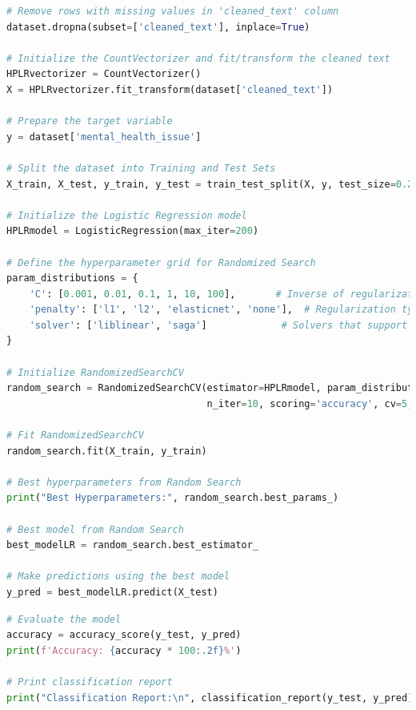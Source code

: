 \begin{tcolorbox}[colback=gray!5!white, colframe=gray!80!black, boxrule=0.5pt, title=Logistic Regression]
    \begin{lstlisting}[language=Python]
# Remove rows with missing values in 'cleaned_text' column
dataset.dropna(subset=['cleaned_text'], inplace=True)

# Initialize the CountVectorizer and fit/transform the cleaned text
HPLRvectorizer = CountVectorizer()
X = HPLRvectorizer.fit_transform(dataset['cleaned_text'])

# Prepare the target variable
y = dataset['mental_health_issue']

# Split the dataset into Training and Test Sets
X_train, X_test, y_train, y_test = train_test_split(X, y, test_size=0.2, random_state=42)

# Initialize the Logistic Regression model
HPLRmodel = LogisticRegression(max_iter=200)

# Define the hyperparameter grid for Randomized Search
param_distributions = {
    'C': [0.001, 0.01, 0.1, 1, 10, 100],       # Inverse of regularization strength
    'penalty': ['l1', 'l2', 'elasticnet', 'none'],  # Regularization types
    'solver': ['liblinear', 'saga']             # Solvers that support l1, elasticnet
}

# Initialize RandomizedSearchCV
random_search = RandomizedSearchCV(estimator=HPLRmodel, param_distributions=param_distributions,
                                   n_iter=10, scoring='accuracy', cv=5, n_jobs=-1, random_state=42)

# Fit RandomizedSearchCV
random_search.fit(X_train, y_train)

# Best hyperparameters from Random Search
print("Best Hyperparameters:", random_search.best_params_)

# Best model from Random Search
best_modelLR = random_search.best_estimator_

# Make predictions using the best model
y_pred = best_modelLR.predict(X_test)

\end{lstlisting}
\end{tcolorbox}

\begin{tcolorbox}[colback=gray!5!white, colframe=gray!80!black, boxrule=0.5pt, title=Logistic Regression]
    \begin{lstlisting}[language=Python]
# Evaluate the model
accuracy = accuracy_score(y_test, y_pred)
print(f'Accuracy: {accuracy * 100:.2f}%')

# Print classification report
print("Classification Report:\n", classification_report(y_test, y_pred))
\end{lstlisting}
\end{tcolorbox}

